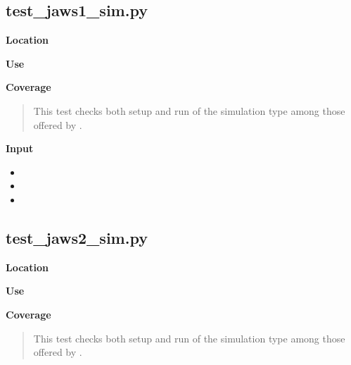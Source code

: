 \documentclass[letterpaper,10pt,english]{manual}
\begin{document}
\subsection{test\_jaws1\_sim.py}

\textbf{Location}
\begin{quote}

\end{quote}

\textbf{Use}
\begin{quote}

\end{quote}

\textbf{Coverage}
\begin{quote}

This test checks both setup and run of the  simulation type among those offered by .
\end{quote}

\textbf{Input}
\begin{itemize}
\item {} 

\item {} 

\item {} 

\end{itemize}


\subsection{test\_jaws2\_sim.py}

\textbf{Location}
\begin{quote}

\end{quote}

\textbf{Use}
\begin{quote}

\end{quote}

\textbf{Coverage}
\begin{quote}

This test checks both setup and run of the  simulation type among those offered by .
\end{quote}
\end{document}
